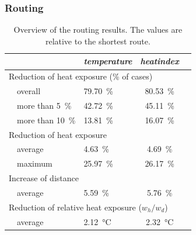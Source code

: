\subsubsection{Routing}

\begin{table}
	\centering
	\begin{tabular}{lp{9.25cm}lcc}
		\toprule
		& & \emph{temperature} & \emph{heatindex} \\
		\midrule
		\multicolumn{4}{l}{Reduction of heat exposure (\% of cases) }   \\
		& overall  & \SI{79.70}{\percent} & \SI{80.53}{\percent}  \\
		& more than \SI{5}{\percent} & \SI{42.72}{\percent} & \SI{45.11}{\percent} \\
		& more than \SI{10}{\percent} & \SI{13.81}{\percent} & \SI{16.07}{\percent} \\
		\multicolumn{4}{l}{Reduction of heat exposure}  \\
		& average  & \SI{4.63}{\percent} & \SI{4.69}{\percent}  \\
		& maximum  & \SI{25.97}{\percent} & \SI{26.17 }{\percent}  \\
		\multicolumn{4}{l}{Increase of distance}  \\
		& average & \SI{5.59}{\percent} & \SI{5.76}{\percent}  \\
		\multicolumn{4}{l}{Reduction of relative heat exposure ($w_h / w_d$)}  \\
		& average  & \SI{2.12}{\celsius} & \SI{2.32}{\celsius}  \\
		\bottomrule
	\end{tabular}
	\caption{Overview of the routing results. The values are relative to the shortest route. \label{tab:results-routing}}
\end{table}

